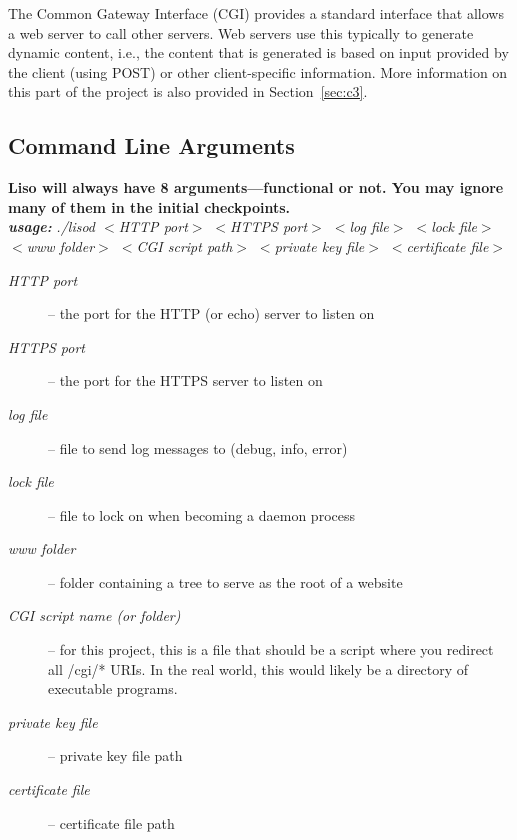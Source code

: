 The Common Gateway Interface (CGI) provides a standard interface that allows a web server to call other servers.  Web servers use this typically to generate dynamic content, i.e., the content that is generated is based on input provided by the client (using POST) or other client-specific information.  More information on this part of the project is also provided in Section~\ref{sec:c3}.

\subsection{Command Line Arguments}
\noindent\textbf{Liso will always have 8 arguments---functional or not. You may ignore many of them in the initial checkpoints.}\\

\textbf{\emph{usage:}} \emph{./lisod $<$HTTP port$>$ $<$HTTPS port$>$
                             $<$log file$>$ $<$lock file$>$ $<$www folder$>$
                             $<$CGI script path$>$ $<$private key file$>$ $<$certificate file$>$}

\begin{description}
	\item[\textnormal{\emph{HTTP port}}] -- the port for the HTTP (or echo) server
                                          to listen on

	\item[\textnormal{\emph{HTTPS port}}] -- the port for the HTTPS server to
                                           listen on

	\item[\textnormal{\emph{log file}}] -- file to send log messages to
                                         (debug, info, error)

	\item[\textnormal{\emph{lock file}}] -- file to lock on when becoming a daemon
                                          process

	\item[\textnormal{\emph{www folder}}] -- folder containing a tree to serve as
                                           the root of a website

	\item[\textnormal{\emph{CGI script name (or folder)}}] --
										   for this project, this is a file that should be
										   a script where you redirect all
										   /cgi/* URIs. In the real world, this
										   would likely be a directory of
										   executable programs.

	\item[\textnormal{\emph{private key file}}] -- private key file path

	\item[\textnormal{\emph{certificate file}}] -- certificate file path
\end{description}


